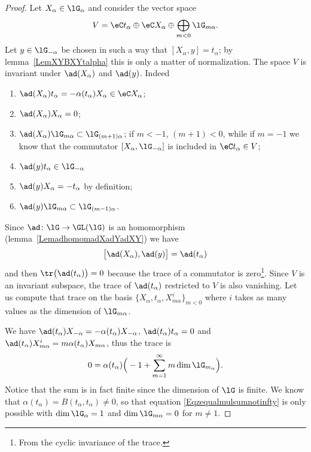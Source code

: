 \begin{proof}
    Let \( X_{\alpha}\in\lG_{\alpha}\) and consider the vector space
    \begin{equation}
        V=\eC t_{\alpha}\oplus\eC X_{\alpha}\oplus\bigoplus_{m<0}\lG_{m\alpha}.
    \end{equation}
    Let \( y\in\lG_{-\alpha}\) be chosen in such a way that \( [X_{\alpha},y]=t_{\alpha}\); by lemma~\ref{LemXYBXYtalpha} this is only a matter of normalization. The space \( V\) is invariant under \( \ad(X_{\alpha})\) and \( \ad(y)\). Indeed
    \begin{enumerate}
        \item
            \( \ad(X_{\alpha})t_{\alpha}=-\alpha(t_{\alpha})X_{\alpha}\in\eC X_{\alpha}\);
        \item
            \( \ad(X_{\alpha})X_{\alpha}=0\);
        \item
            \( \ad(X_{\alpha})\lG_{m\alpha}\subset\lG_{(m+1)\alpha}\); if \( m<-1\), \( (m+1)<0\), while if \( m=-1\) we know that the commutator \( [X_{\alpha},\lG_{-\alpha}]\) is included in \( \eC t_{\alpha}\in V\);
        \item
            \( \ad(y)t_{\alpha}\in\lG_{-\alpha}\)
        \item
            \( \ad(y)X_{\alpha}=-t_{\alpha}\) by definition;
        \item
            \( \ad(y)\lG_{m\alpha}\subset\lG_{(m-1)\alpha}\).
    \end{enumerate}
    Since \( \ad\colon \lG\to \GL(\lG)\) is an homomorphism (lemma~\ref{LemadhomomadXadYadXY}) we have
    \begin{equation}
        \big[ \ad(X_{\alpha}),\ad(y) \big]=\ad(t_{\alpha})
    \end{equation}
    and then \( \tr\big( \ad(t_{\alpha}) \big)=0\) because the trace of a commutator is zero\footnote{From the cyclic invariance of the trace.}. Since \( V\) is an invariant subspace, the trace of \( \ad(t_{\alpha})\) restricted to \( V\) is also vanishing. Let us compute that trace on the basis \( \{ X_{\alpha},t_{\alpha},X^i_{m\alpha} \}_{m<0}\) where \( i\) takes as many values as the dimension of \( \lG_{m\alpha}\).

    We have \( \ad(t_{\alpha})X_{-\alpha}=-\alpha(t_{\alpha})X_{-\alpha}\), \( \ad(t_{\alpha})t_{\alpha}=0\) and \( \ad(t_{\alpha})X^i_{m\alpha}=m\alpha(t_{\alpha})X_{m\alpha}\), thus the trace is
    \begin{equation}    \label{Eqzequalmulsumnotinfty}
        0=\alpha(t_{\alpha})\Big( -1+\sum_{m=1}^{\infty}m\dim\lG_{m_{\alpha}} \Big).
    \end{equation}
    Notice that the sum is in fact finite since the dimension of \( \lG\) is finite. We know that \( \alpha(t_{\alpha})=B(t_{\alpha},t_{\alpha})\neq 0\), so that equation \eqref{Eqzequalmulsumnotinfty} is only possible with \( \dim\lG_{\alpha}=1\) and \( \dim\lG_{m\alpha}=0\) for \( m\neq 1\).
\end{proof}


